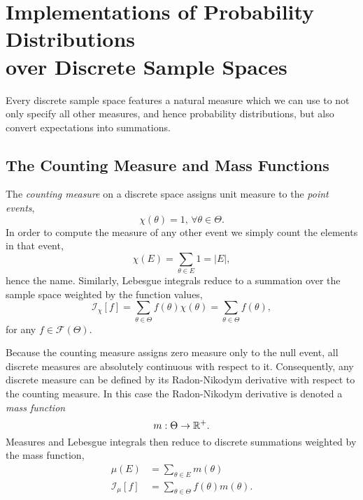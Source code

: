 \section{Implementations of Probability Distributions \\ 
over Discrete Sample Spaces}

Every discrete sample space features a natural measure which we 
can use to not only specify all other measures, and hence probability 
distributions, but also convert expectations into summations.

\subsection{The Counting Measure and Mass Functions}

The \emph{counting measure} on a discrete space assigns unit
measure to the \emph{point events},
%
\begin{equation*}
\chi \! \left( \theta \right) = 1, \, \forall \theta \in \Theta.
\end{equation*}
%
In order to compute the measure of any other event we 
simply count the elements in that event,
%
\begin{equation*}
\chi \! \left( E \right)
=
\sum_{\theta \in E}  1 = \left| E \right|,
\end{equation*}
%
hence the name.  Similarly, Lebesgue integrals reduce to a 
summation over the sample space weighted by the function 
values,
%
\begin{equation*}
\mathcal{I}_{\chi} \! \left[ f \right]
=
\sum_{\theta \in \Theta} 
f \! \left( \theta \right) \chi \! \left( \theta \right)
=
\sum_{\theta \in \Theta} f \! \left( \theta \right),
\end{equation*}
%
for any $f \in \mathcal{F} \! \left( \Theta \right)$.

Because the counting measure assigns zero measure only to the
null event, all discrete measures are absolutely continuous with
respect to it.  Consequently, any discrete measure can be defined
by its Radon-Nikodym derivative with respect to the counting measure.
In this case the Radon-Nikodym derivative is denoted a 
\emph{mass function}
%
\begin{equation*}
m : \Theta \rightarrow \mathbb{R}^{+}.
\end{equation*}
%
Measures and Lebesgue integrals then reduce to discrete summations
weighted by the mass function,
%
\begin{align*}
\mu \! \left( E \right)
&=
\sum_{\theta \in E} m \! \left( \theta \right)
\\
\mathcal{I}_{\mu} \! \left[ f \right]
&=
\sum_{\theta \in \Theta} f \! \left( \theta \right) m \! \left( \theta \right).
\end{align*}

